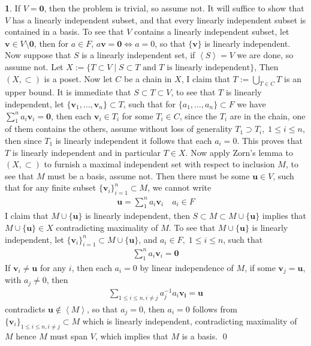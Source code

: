 \documentclass[11pt]{article}
\theoremstyle{definition}
\newtheorem{pb}{}
\newcommand{\set}[1]{\{#1\}}
\newcommand{\gen}[1]{\left\langle #1 \right\rangle}
\newcommand{\tand}{\text{ and }}
\begin{document}
    \begin{pb}
        If \(V = \mathbf{0}\), then the problem is trivial, so assume not. It will suffice to show that \(V\) has a linearly independent subset, and that every linearly independent subset is contained in a basis. To see that \(V\) contains a linearly independent subset, let \(\mathbf{v} \in V\setminus\mathbf{0}\), then for \(a \in F\), \(a\mathbf{v} = \mathbf{0} \iff a = 0\), so that \(\set{\mathbf{v}}\) is linearly independent. Now suppose that \(S\) is a linearly independent set, if \(\gen{S} = V\) we are done, so assume not. Let \(X := \set{T \subset V \mid S \subset T \tand T \text{ is linearly independent}}\), Then \((X,\subset)\) is a poset. Now let \(C\) be a chain in \(X\), I claim that \(T := \bigcup_{T \in C}T\) is an upper bound. It is immediate that \(S \subset T \subset V\), to see that \(T\) is linearly independent, let \(\set{\mathbf{v}_1,\hdots,\mathbf{v}_n} \subset T\), such that for \(\set{a_1,\hdots,a_n} \subset F\) we have \(\sum_1^n a_i\mathbf{v}_i = \mathbf{0}\), then each \(\mathbf{v}_i \in T_i\) for some \(T_i \in C\), since the \(T_i\) are in the chain, one of them contains the others, assume without loss of generality
        \(T_1 \supset T_i, \; 1 \leq i \leq n\), then since \(T_1\) is linearly independent it follows that each \(a_i = 0\). This proves that \(T\) is linearly independent and in particular \(T \in X\). Now apply Zorn's lemma to \((X,\subset)\) to furnish a maximal independent set with respect to inclusion \(M\), to see that \(M\) must be a basis, assume not. Then there must be some \(\mathbf{u} \in V\), such that for any finite subset \(\set{\mathbf{v}_i}_{i=1}^n \subset M\), we cannot write
        \begin{align*}
            \mathbf{u} = \sum_1^n a_i\mathbf{v}_i \quad a_i \in F
        \end{align*}
        I claim that \(M \cup \set{\mathbf{u}}\) is linearly independent, then \(S \subset M \subset M \cup \set{\mathbf{u}}\) implies that \(M \cup \set{\mathbf{u}} \in X\) contradicting maximality of \(M\). To see that \(M \cup \set{\mathbf{u}}\) is linearly independent, let \(\set{\mathbf{v}_i}_{i=1}^n \subset M \cup \set{\mathbf{u}}\), and \(a_i \in F, \; 1\leq i \leq n\), such that
        \begin{align*}
            \sum_1^n a_i\mathbf{v}_i = \mathbf{0}
        \end{align*}
        If \(\mathbf{v}_i \neq \mathbf{u}\) for any \(i\), then each \(a_i = 0\) by linear independence of \(M\), if some \(\mathbf{v}_j = \mathbf{u}\), with \(a_j \neq 0\), then
        \begin{align*}
            \sum_{1 \leq i \leq n, i \neq j}a_j^{-1}a_i\mathbf{v_i} = \mathbf{u}
        \end{align*}
        contradicts \(\mathbf{u} \not \in \gen{M}\), so that \(a_j = 0\), then \(a_i = 0\) follows from \(\set{\mathbf{v}_i}_{1 \leq i \leq n, i \neq j} \subset M\) which is linearly independent, contradicting maximality of \(M\) hence \(M\) must span \(V\), which implies that \(M\) is a basis. \qed
    \end{pb}
\end{document}
